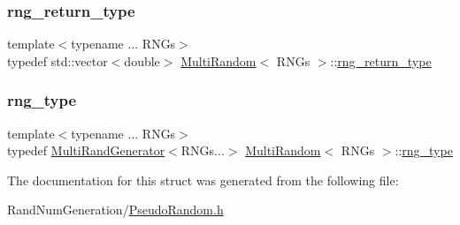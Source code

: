 \hypertarget{struct_multi_random_a8280971d100a3f24afc0432e3dc58dbb}{}\label{struct_multi_random_a8280971d100a3f24afc0432e3dc58dbb} 
\subsubsection{\texorpdfstring{rng\+\_\+return\+\_\+type}{rng\_return\_type}}
{\footnotesize\ttfamily template$<$typename ... R\+N\+Gs$>$ \\
typedef std\+::vector$<$double$>$ \hyperlink{struct_multi_random}{Multi\+Random}$<$ R\+N\+Gs $>$\+::\hyperlink{struct_multi_random_a8280971d100a3f24afc0432e3dc58dbb}{rng\+\_\+return\+\_\+type}}

\hypertarget{struct_multi_random_ab52e2897d9a16b9d00ff5e58f2528220}{}\label{struct_multi_random_ab52e2897d9a16b9d00ff5e58f2528220} 
\subsubsection{\texorpdfstring{rng\+\_\+type}{rng\_type}}
{\footnotesize\ttfamily template$<$typename ... R\+N\+Gs$>$ \\
typedef \hyperlink{class_multi_rand_generator}{Multi\+Rand\+Generator}$<$R\+N\+Gs...$>$ \hyperlink{struct_multi_random}{Multi\+Random}$<$ R\+N\+Gs $>$\+::\hyperlink{struct_multi_random_ab52e2897d9a16b9d00ff5e58f2528220}{rng\+\_\+type}}



The documentation for this struct was generated from the following file\+:\begin{DoxyCompactItemize}
\item 
Rand\+Num\+Generation/\hyperlink{_pseudo_random_8h}{Pseudo\+Random.\+h}\end{DoxyCompactItemize}
